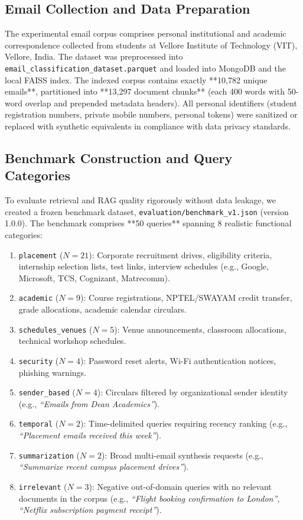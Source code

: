 \documentclass[11pt,a4paper]{article}
\begin{document}
\subsection{Email Collection and Data Preparation}
The experimental email corpus comprises personal institutional and academic correspondence collected from students at Vellore Institute of Technology (VIT), Vellore, India. The dataset was preprocessed into \texttt{email\_classification\_dataset.parquet} and loaded into MongoDB and the local FAISS index. The indexed corpus contains exactly **10,782 unique emails**, partitioned into **13,297 document chunks** (each 400 words with 50-word overlap and prepended metadata headers). All personal identifiers (student registration numbers, private mobile numbers, personal tokens) were sanitized or replaced with synthetic equivalents in compliance with data privacy standards.

\subsection{Benchmark Construction and Query Categories}
To evaluate retrieval and RAG quality rigorously without data leakage, we created a frozen benchmark dataset, \texttt{evaluation/benchmark\_v1.json} (version 1.0.0). The benchmark comprises **50 queries** spanning 8 realistic functional categories:
\begin{enumerate}
    \item \texttt{placement} ($N=21$): Corporate recruitment drives, eligibility criteria, internship selection lists, test links, interview schedules (e.g., Google, Microsoft, TCS, Cognizant, Matrecomm).
    \item \texttt{academic} ($N=9$): Course registrations, NPTEL/SWAYAM credit transfer, grade allocations, academic calendar circulars.
    \item \texttt{schedules\_venues} ($N=5$): Venue announcements, classroom allocations, technical workshop schedules.
    \item \texttt{security} ($N=4$): Password reset alerts, Wi-Fi authentication notices, phishing warnings.
    \item \texttt{sender\_based} ($N=4$): Circulars filtered by organizational sender identity (e.g., \textit{``Emails from Dean Academics''}).
    \item \texttt{temporal} ($N=2$): Time-delimited queries requiring recency ranking (e.g., \textit{``Placement emails received this week''}).
    \item \texttt{summarization} ($N=2$): Broad multi-email synthesis requests (e.g., \textit{``Summarize recent campus placement drives''}).
    \item \texttt{irrelevant} ($N=3$): Negative out-of-domain queries with no relevant documents in the corpus (e.g., \textit{``Flight booking confirmation to London'', ``Netflix subscription payment receipt''}).
\end{enumerate}
\end{document}

